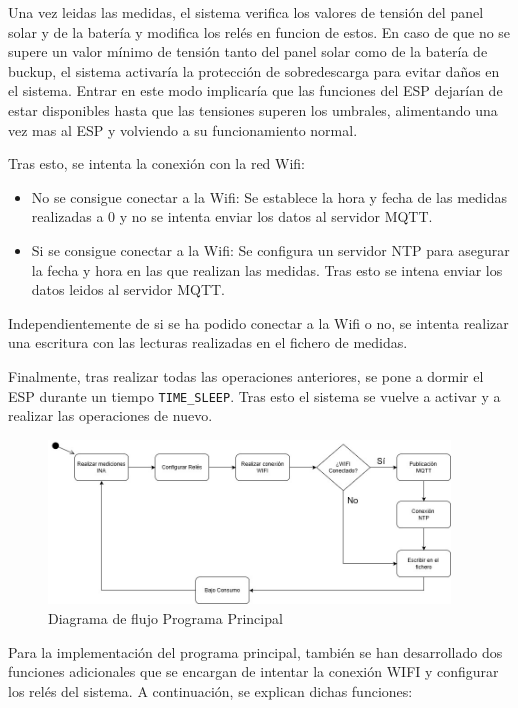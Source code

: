 Una vez leidas las medidas, el sistema verifica los valores de tensión del panel solar y de la batería y modifica los relés en funcion de estos.
En caso de que no se supere un valor mínimo de tensión tanto del panel solar como de la batería de buckup, el sistema activaría la protección de sobredescarga para evitar daños en el sistema. 
Entrar en este modo implicaría que las funciones del ESP dejarían de estar disponibles hasta que las tensiones superen los umbrales, alimentando una vez mas al ESP y volviendo a su funcionamiento normal.

Tras esto, se intenta la conexión con la red Wifi:
\begin{itemize}
    \item No se consigue conectar a la Wifi: Se establece la hora y fecha de las medidas realizadas a 0 y no se intenta enviar los datos al servidor MQTT. 
    \item Si se consigue conectar a la Wifi: Se configura un servidor NTP para asegurar la fecha y hora en las que realizan las medidas. Tras esto se intena enviar los datos leidos al servidor MQTT.
\end{itemize}

Independientemente de si se ha podido conectar a la Wifi o no, se intenta realizar una escritura con las lecturas realizadas en el fichero de medidas.

Finalmente, tras realizar todas las operaciones anteriores, se pone a dormir el ESP durante un tiempo \texttt{TIME\_SLEEP}. Tras esto el sistema se vuelve a activar y a realizar las operaciones de nuevo.

\begin{figure}[H]
    \centering
    \includegraphics[width=0.95\textwidth]{images/3-software/3-3-programaprincipal/DiagramaDeFlujoPOWER.jpg}
    \caption{Diagrama de flujo Programa Principal}
    \label{fig:3-3-1-DiagramaFlujo}
\end{figure}

Para la implementación del programa principal, también se han desarrollado dos funciones adicionales que se encargan de intentar la conexión WIFI y configurar los relés del sistema. A continuación, se explican dichas funciones:

